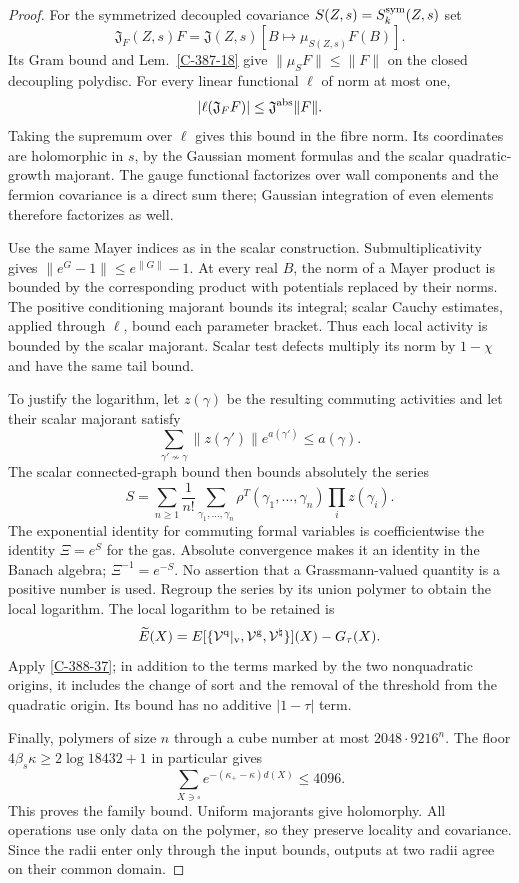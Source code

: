 \documentclass[11pt,letterpaper,reqno]{amsart}
\theoremstyle{definition}
\theoremstyle{remark}
\begin{document}
\begin{proof}
For the symmetrized decoupled covariance
$S(Z,s)=S_k^{\rm sym}(Z,s)$ set
\[
 \mathfrak J_F(Z,s)F=
 \mathfrak J(Z,s)[B\mapsto\mu_{S(Z,s)}F(B)].
\]
Its Gram bound and Lem.~\ref{C-387-18} give
$\|\mu_SF\|\le\|F\|$ on the closed decoupling polydisc.
For every linear functional $\ell$ of norm at most one,
\[
 |\ell(\mathfrak J_FF)|
 \le\mathfrak J^{\rm abs}\|F\|.
\]
Taking the supremum over $\ell$ gives this bound in the fibre
norm.  Its coordinates are holomorphic in $s$, by the Gaussian
moment formulas and the scalar quadratic-growth majorant.
The gauge functional factorizes over wall components and the
fermion covariance is a direct sum there; Gaussian integration
of even elements therefore factorizes as well.

Use the same Mayer indices as in the scalar construction.
Submultiplicativity gives
$\|e^G-1\|\le e^{\|G\|}-1$.  At every real $B$, the norm
of a Mayer product is bounded by the corresponding product
with potentials replaced by their norms.  The positive
conditioning majorant bounds its integral; scalar Cauchy
estimates, applied through $\ell$, bound each parameter
bracket.  Thus each local activity is bounded by the
scalar majorant.  Scalar test defects multiply its norm by
$1-\chi$ and have the same tail bound.

To justify the logarithm, let $z(\gamma)$ be the resulting
commuting activities and let their scalar majorant satisfy
\[
 \sum_{\gamma'\nsim\gamma}\|z(\gamma')\|e^{a(\gamma')}
                                      \le a(\gamma).
\]
The scalar connected-graph bound then bounds absolutely the
series
\[
 S=\sum_{n\ge1}\frac1{n!}\sum_{\gamma_1,\ldots,\gamma_n}
 \rho^T(\gamma_1,\ldots,\gamma_n)\prod_i z(\gamma_i).
\]
The exponential identity for commuting formal variables is
coefficientwise the identity $\Xi=e^S$ for the gas.  Absolute
convergence makes it an identity in the Banach algebra;
$\Xi^{-1}=e^{-S}$.  No assertion that a Grassmann-valued
quantity is a positive number is used.  Regroup the series
by its union polymer to obtain the local logarithm.
The local logarithm to be retained is
\[
 \widetilde E(X)=E[\{\mathcal V^{\rm q}|_{\rm v},
            \mathcal V^{\rm g},\mathcal V^\natural\}](X)-G_\tau(X).
\]
Apply \cref{C-388-37}; in addition to the terms marked by
the two nonquadratic origins, it includes the change of
sort and the removal of the threshold from the quadratic
origin.  Its bound has no additive $|1-\tau|$ term.

Finally, polymers of size $n$ through a cube number at most
$2048\cdot9216^n$.  The floor
$4\beta_s\kappa\ge2\log18432+1$ in particular gives
\[
 \sum_{X\ni\square}e^{-(\kappa_+-\kappa)d(X)}\le4096.
\]
This proves the family bound.  Uniform majorants give
holomorphy.  All operations use only data on the polymer, so
they preserve locality and covariance.  Since the radii enter
only through the input bounds, outputs at two radii agree on
their common domain.
\end{proof}
\end{document}
